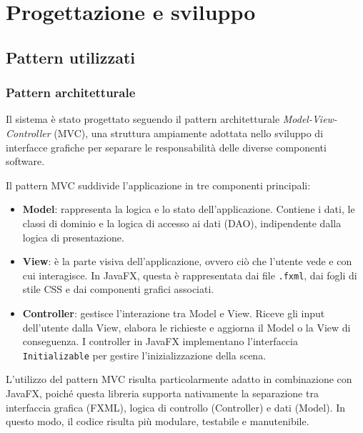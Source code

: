 \documentclass[a4paper]{article}
\begin{document}
\section{Progettazione e sviluppo}

\subsection{Pattern utilizzati}
\subsubsection{Pattern architetturale}
Il sistema è stato progettato seguendo il pattern architetturale \textit{Model-View-Controller} (MVC), una struttura ampiamente adottata nello sviluppo di interfacce grafiche per separare le responsabilità delle diverse componenti software.

Il pattern MVC suddivide l'applicazione in tre componenti principali:

\begin{itemize}
    \item \textbf{Model}: rappresenta la logica e lo stato dell’applicazione. Contiene i dati, le classi di dominio e la logica di accesso ai dati (DAO), indipendente dalla logica di presentazione.

    \item \textbf{View}: è la parte visiva dell’applicazione, ovvero ciò che l’utente vede e con cui interagisce. In JavaFX, questa è rappresentata dai file \texttt{.fxml}, dai fogli di stile CSS e dai componenti grafici associati.

    \item \textbf{Controller}: gestisce l’interazione tra Model e View. Riceve gli input dell’utente dalla View, elabora le richieste e aggiorna il Model o la View di conseguenza. I controller in JavaFX implementano l’interfaccia \texttt{Initializable} per gestire l’inizializzazione della scena.
\end{itemize}

\bigskip

L'utilizzo del pattern MVC risulta particolarmente adatto in combinazione con JavaFX, poiché questa libreria supporta nativamente la separazione tra interfaccia grafica (FXML), logica di controllo (Controller) e dati (Model). In questo modo, il codice risulta più modulare, testabile e manutenibile.
\end{document}
